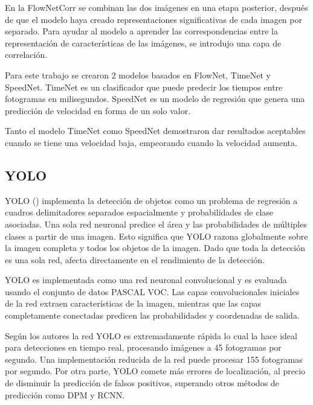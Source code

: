 En la FlowNetCorr se combinan las dos imágenes en una etapa posterior, después de que el modelo haya creado representaciones significativas de cada imagen por separado. Para ayudar al modelo a aprender las correspondencias entre la representación de características de las imágenes, se introdujo una capa de correlación.

Para este trabajo se crearon 2 modelos basados en FlowNet, TimeNet y SpeedNet. TimeNet es un clasificador que puede predecir los tiempos entre fotogramas en milisegundos. SpeedNet es un modelo de regresión que genera una predicción de velocidad en forma de un solo valor.

Tanto el modelo TimeNet como SpeedNet demostraron dar resultados aceptables cuando se tiene una velocidad baja, empeorando cuando la velocidad aumenta.

\subsection{YOLO}

YOLO (\cite{redmon2016Yolo}) implementa la detección de objetos como un problema de regresión a cuadros delimitadores separados espacialmente y probabilidades de clase asociadas. Una sola red neuronal predice el área y las probabilidades de múltiples clases a partir de una imagen. Esto significa que YOLO razona globalmente sobre la imagen completa y todos los objetos de la imagen. Dado que toda la detección es una sola red, afecta directamente en el rendimiento de la detección.

YOLO es implementada como una red neuronal convolucional y es evaluada usando el conjunto de datos PASCAL VOC. Las capas convolucionales iniciales de la red extraen características de la imagen, mientras que las capas completamente conectadas predicen las probabilidades y coordenadas de salida.

Según los autores la red YOLO es extremadamente rápida lo cual la hace ideal para detecciones en tiempo real, procesando imágenes a 45 fotogramas por segundo. Una implementación reducida de la red puede procesar 155 fotogramas por segundo. Por otra parte, YOLO comete más errores de localización, al precio de disminuir la predicción de falsos positivos, superando otros métodos de predicción como DPM y RCNN.
